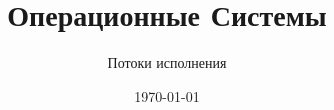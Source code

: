\documentclass[handout,12pt]{beamer}
\title{Операционные Системы}
\subtitle{Потоки исполнения}
\date{\today}
\begin{document}
  \begin{frame}
    \titlepage
  \end{frame}
  
  
  
  
\end{document}

